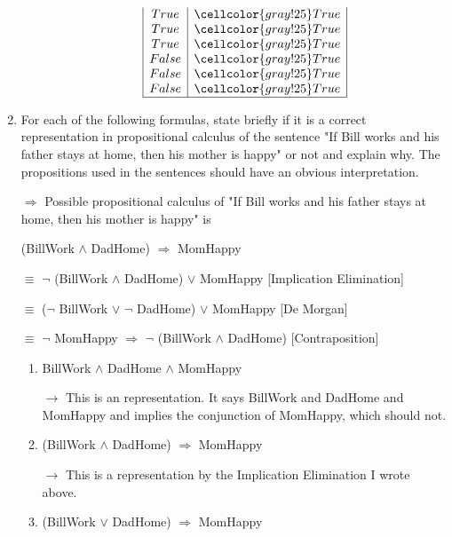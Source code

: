 \documentclass[10pt]{article}
\begin{document}
\begin{enumerate}
\begin{enumerate}
\begin{displaymath}
\begin{array} {|c|c|c|c|c|c|c|}
      \multicolumn{2}{|c|}{True} & \multicolumn{5}{c|}{\cellcolor{gray!25}True}\\
      \multicolumn{2}{|c|}{True} & \multicolumn{5}{c|}{\cellcolor{gray!25}True}\\
      \multicolumn{2}{|c|}{True} & \multicolumn{5}{c|}{\cellcolor{gray!25}True}\\
      \multicolumn{2}{|c|}{False} & \multicolumn{5}{c|}{\cellcolor{gray!25}True}\\
      \multicolumn{2}{|c|}{False} & \multicolumn{5}{c|}{\cellcolor{gray!25}True}\\
      \multicolumn{2}{|c|}{False} & \multicolumn{5}{c|}{\cellcolor{gray!25}True}\\
      \hline
    \end{array}
  \end{displaymath}
  \end{enumerate}
  \newpage
\item For each of the following formulas, state briefly if it is a correct representation in propositional calculus of the sentence "If Bill works and his father stays at home, then his mother is happy" or not and explain why. The propositions used in the sentences should have an obvious interpretation. \par
$\Rightarrow$ Possible propositional calculus of "If Bill works and his father stays at home, then his mother is happy" is \par
(BillWork $\wedge$ DadHome) $\Rightarrow$ MomHappy \par
$\equiv$ $\neg$ (BillWork $\wedge$ DadHome) $\vee$ MomHappy [Implication Elimination] \par
$\equiv$ ($\neg$ BillWork $\vee$ $\neg$ DadHome) $\vee$ MomHappy [De Morgan] \par
$\equiv$ $\neg$ MomHappy $\Rightarrow$ $\neg$ (BillWork $\wedge$ DadHome) [Contraposition]
  \begin{enumerate}
  \item BillWork $\wedge$ DadHome $\wedge$ MomHappy \par
  $\rightarrow$ This is an  representation. It says BillWork and DadHome and MomHappy and implies the conjunction of MomHappy, which should not.
  \item (BillWork $\wedge$ DadHome) $\Rightarrow$ MomHappy \par
  $\rightarrow$ This is a  representation by the Implication Elimination I wrote above.
  \item (BillWork $\vee$ DadHome) $\Rightarrow$ MomHappy \par

\end{enumerate}
\end{enumerate}
\end{document}
